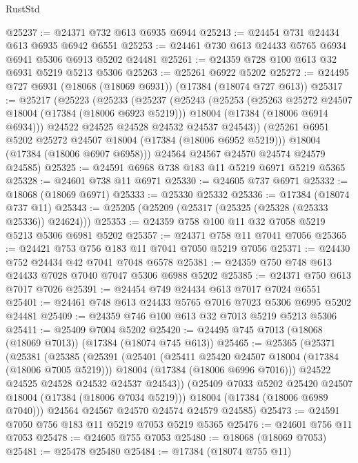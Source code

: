 \begin{lexlean}{RustStd}
\begin{coremodule}
@25237 := @24371 @732 @613 @6935 @6944
@25243 := @24454 @731 @24434 @613 @6935 @6942 @6551
@25253 := @24461 @730 @613 @24433 @5765 @6934 @6941 @5306 @6913 @5202 @24481
@25261 := @24359 @728 @100 @613 @32 @6931 @5219 @5213 @5306
@25263 := @25261 @6922 @5202
@25272 := @24495 @727 @6931 (@18068 (@18069 @6931)) (@17384 (@18074 @727 @613))
@25317 := @25217
    (@25223
      (@25233
        (@25237
          (@25243
            (@25253
              (@25263 @25272 @24507 @18004 (@17384 (@18006 @6923 @5219)))
              @18004
              (@17384 (@18006 @6914 @6934)))
            @24522
            @24525
            @24528
            @24532
            @24537
            @24543))
        (@25261 @6951 @5202 @25272 @24507 @18004 (@17384 (@18006 @6952 @5219)))
        @18004
        (@17384 (@18006 @6907 @6958)))
      @24564
      @24567
      @24570
      @24574
      @24579
      @24585)
@25325 := @24591 @6968 @738 @183 @11 @5219 @6971 @5219 @5365
@25328 := @24601 @738 @11 @6971
@25330 := @24605 @737 @6971
@25332 := @18068 (@18069 @6971)
@25333 := @25330 @25332
@25336 := @17384 (@18074 @737 @11)
@25343 := @25205 (@25209 (@25317 (@25325 (@25328 (@25333 @25336)) @24624)))
@25353 := @24359 @758 @100 @11 @32 @7058 @5219 @5213 @5306 @6981 @5202
@25357 := @24371 @758 @11 @7041 @7056
@25365 := @24421 @753 @756 @183 @11 @7041 @7050 @5219 @7056
@25371 := @24430 @752 @24434 @42 @7041 @7048 @6578
@25381 := @24359 @750 @748 @613 @24433 @7028 @7040 @7047 @5306 @6988 @5202
@25385 := @24371 @750 @613 @7017 @7026
@25391 := @24454 @749 @24434 @613 @7017 @7024 @6551
@25401 := @24461 @748 @613 @24433 @5765 @7016 @7023 @5306 @6995 @5202 @24481
@25409 := @24359 @746 @100 @613 @32 @7013 @5219 @5213 @5306
@25411 := @25409 @7004 @5202
@25420 := @24495 @745 @7013 (@18068 (@18069 @7013)) (@17384 (@18074 @745 @613))
@25465 := @25365
    (@25371
      (@25381
        (@25385
          (@25391
            (@25401
              (@25411 @25420 @24507 @18004 (@17384 (@18006 @7005 @5219)))
              @18004
              (@17384 (@18006 @6996 @7016)))
            @24522
            @24525
            @24528
            @24532
            @24537
            @24543))
        (@25409 @7033 @5202 @25420 @24507 @18004 (@17384 (@18006 @7034 @5219)))
        @18004
        (@17384 (@18006 @6989 @7040)))
      @24564
      @24567
      @24570
      @24574
      @24579
      @24585)
@25473 := @24591 @7050 @756 @183 @11 @5219 @7053 @5219 @5365
@25476 := @24601 @756 @11 @7053
@25478 := @24605 @755 @7053
@25480 := @18068 (@18069 @7053)
@25481 := @25478 @25480
@25484 := @17384 (@18074 @755 @11)

\end{coremodule}
\end{lexlean}
